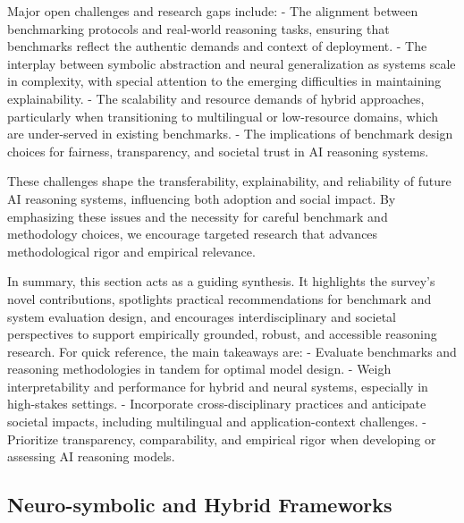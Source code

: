 \documentclass[sigconf]{acmart}
\begin{document}
Major open challenges and research gaps include:
- The alignment between benchmarking protocols and real-world reasoning tasks, ensuring that benchmarks reflect the authentic demands and context of deployment.
- The interplay between symbolic abstraction and neural generalization as systems scale in complexity, with special attention to the emerging difficulties in maintaining explainability.
- The scalability and resource demands of hybrid approaches, particularly when transitioning to multilingual or low-resource domains, which are under-served in existing benchmarks.
- The implications of benchmark design choices for fairness, transparency, and societal trust in AI reasoning systems.

These challenges shape the transferability, explainability, and reliability of future AI reasoning systems, influencing both adoption and social impact. By emphasizing these issues and the necessity for careful benchmark and methodology choices, we encourage targeted research that advances methodological rigor and empirical relevance. 

In summary, this section acts as a guiding synthesis. It highlights the survey’s novel contributions, spotlights practical recommendations for benchmark and system evaluation design, and encourages interdisciplinary and societal perspectives to support empirically grounded, robust, and accessible reasoning research. For quick reference, the main takeaways are:
- Evaluate benchmarks and reasoning methodologies in tandem for optimal model design.
- Weigh interpretability and performance for hybrid and neural systems, especially in high-stakes settings.
- Incorporate cross-disciplinary practices and anticipate societal impacts, including multilingual and application-context challenges.
- Prioritize transparency, comparability, and empirical rigor when developing or assessing AI reasoning models.

\subsection{Neuro-symbolic and Hybrid Frameworks}
\end{document}

